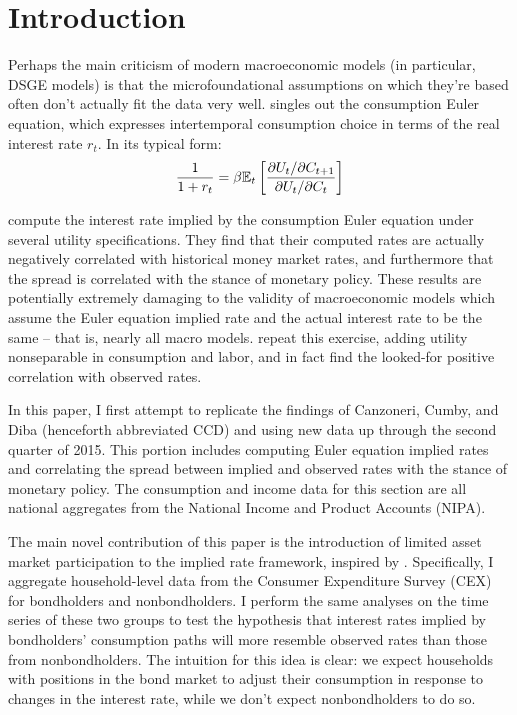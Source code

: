 \section{Introduction}
Perhaps the main criticism of modern macroeconomic models (in particular, DSGE models) is that the microfoundational assumptions on which they're based often don't actually fit the data very well. \cite{smith14} singles out the consumption Euler equation, which expresses intertemporal consumption choice in terms of the real interest rate $r_t$. In its typical form: $$\frac{1}{1 + r_t} = \beta \mathbb{E}_t \left[  \frac{\partial U_t / \partial C_{t+1}}{\partial U_t / \partial C_t}  \right]$$

\cite{canzoneri07} compute the interest rate implied by the consumption Euler equation under several utility specifications. They find that their computed rates are actually negatively correlated with historical money market rates, and furthermore that the spread is correlated with the stance of monetary policy. These results are potentially extremely damaging to the validity of macroeconomic models which assume the Euler equation implied rate and the actual interest rate to be the same -- that is, nearly all macro models. \cite{collard11} repeat this exercise, adding utility nonseparable in consumption and labor, and in fact find the looked-for positive correlation with observed rates.

In this paper, I first attempt to replicate the findings of Canzoneri, Cumby, and Diba (henceforth abbreviated CCD) and \cite{collard11} using new data up through the second quarter of 2015.  This portion includes computing Euler equation implied rates and correlating the spread between implied and observed rates with the stance of monetary policy. The consumption and income data for this section are all national aggregates from the National Income and Product Accounts (NIPA).

The main novel contribution of this paper is the introduction of limited asset market participation to the implied rate framework, inspired by \cite{vissing02}. Specifically, I aggregate household-level data from the Consumer Expenditure Survey (CEX) for bondholders and nonbondholders. I perform the same analyses on the time series of these two groups to test the hypothesis that interest rates implied by bondholders' consumption paths will more resemble observed rates than those from nonbondholders. The intuition for this idea is clear: we expect households with positions in the bond market to adjust their consumption in response to changes in the interest rate, while we don't expect nonbondholders to do so.

